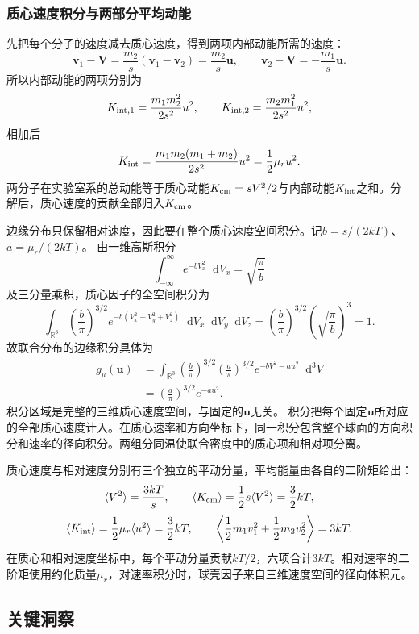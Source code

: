 \documentclass[UTF8,fontset=fandol,a4paper,11pt]{ctexart}
\newcommand{\dd}{\mathop{}\!\mathrm{d}}
\begin{document}
\subsubsection*{质心速度积分与两部分平均动能}
先把每个分子的速度减去质心速度，得到两项内部动能所需的速度：
\[
\bm v_1-\bm V=\frac{m_2}{s}(\bm v_1-\bm v_2)
=\frac{m_2}{s}\bm u,\qquad
\bm v_2-\bm V=-\frac{m_1}{s}\bm u.
\]
所以内部动能的两项分别为
\[
K_{\rm int,1}=\frac{m_1m_2^2}{2s^2}u^2,\qquad
K_{\rm int,2}=\frac{m_2m_1^2}{2s^2}u^2,
\]
相加后
\[
K_{\rm int}=\frac{m_1m_2(m_1+m_2)}{2s^2}u^2
=\frac12\mu_ru^2.
\]
两分子在实验室系的总动能等于质心动能$K_{\rm cm}=sV^2/2$与内部动能$K_{\rm int}$之和。分解后，质心速度的贡献全部归入$K_{\rm cm}$。

边缘分布只保留相对速度，因此要在整个质心速度空间积分。记$b=s/(2kT)$、$a=\mu_r/(2kT)$。
由一维高斯积分
\[
\int_{-\infty}^\infty e^{-bV_x^2}\dd V_x=\sqrt{\frac\pi b}
\]
及三分量乘积，质心因子的全空间积分为
\[
\int_{\mathbb R^3}\left(\frac b\pi\right)^{3/2}
e^{-b(V_x^2+V_y^2+V_z^2)}\dd V_x\dd V_y\dd V_z
=\left(\frac b\pi\right)^{3/2}
\left(\sqrt{\frac\pi b}\right)^3=1.
\]
故联合分布的边缘积分具体为
\[
\begin{aligned}
g_u(\bm u)
&=\int_{\mathbb R^3}
\left(\frac b\pi\right)^{3/2}
\left(\frac a\pi\right)^{3/2}
e^{-bV^2-au^2}\dd^3V\\
&=\left(\frac a\pi\right)^{3/2}e^{-au^2}.
\end{aligned}
\]
积分区域是完整的三维质心速度空间，与固定的$\bm u$无关。
积分把每个固定$\bm u$所对应的全部质心速度计入。在质心速率和方向坐标下，同一积分包含整个球面的方向积分和速率的径向积分。两组分同温使联合密度中的质心项和相对项分离。

质心速度与相对速度分别有三个独立的平动分量，平均能量由各自的二阶矩给出：
\[
\langle V^2\rangle=\frac{3kT}{s},\qquad
\langle K_{\rm cm}\rangle=\frac12s\langle V^2\rangle=\frac32kT,
\]
\[
\langle K_{\rm int}\rangle
=\frac12\mu_r\langle u^2\rangle=\frac32kT,\qquad
\left\langle\frac12m_1v_1^2+\frac12m_2v_2^2\right\rangle=3kT.
\]
在质心和相对速度坐标中，每个平动分量贡献$kT/2$，六项合计$3kT$。相对速率的二阶矩使用约化质量$\mu_r$，对速率积分时，球壳因子来自三维速度空间的径向体积元。





\subsection*{关键洞察}
\end{document}
